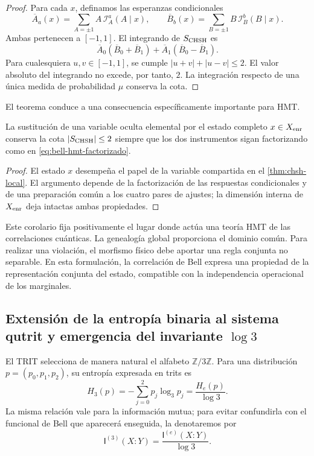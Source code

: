 \begin{proof}
Para cada \(x\), definamos las esperanzas condicionales
\[
 \overline A_a(x)=\sum_{A=\pm1}A\,\mathcal I_A^a(A\mid x),
 \qquad
 \overline B_b(x)=\sum_{B=\pm1}B\,\mathcal I_B^b(B\mid x).
\]
Ambas pertenecen a \([-1,1]\). El integrando de
\(S_{\rm CHSH}\) es
\[
 \overline A_0(\overline B_0+\overline B_1)
 +\overline A_1(\overline B_0-\overline B_1).
\]
Para cualesquiera \(u,v\in[-1,1]\), se cumple
\(\lvert u+v\rvert+\lvert u-v\rvert\leq2\). El valor absoluto del
integrando no excede, por tanto, \(2\). La integración respecto de una única
medida de probabilidad \(\mu\) conserva la cota.
\end{proof}

El teorema conduce a una consecuencia específicamente importante para HMT.

\begin{corollary}
\label{cor:no-go-bell-memoria}
La sustitución de una variable oculta elemental por el estado completo
\(x\in X_{\rm enr}\) conserva la cota
\(\lvert S_{\rm CHSH}\rvert\leq2\) siempre que los dos instrumentos sigan
factorizando como en \eqref{eq:bell-hmt-factorizado}.
\end{corollary}

\begin{proof}
El estado \(x\) desempeña el papel de la variable compartida en el
\cref{thm:chsh-local}. El argumento depende de la factorización de las respuestas
condicionales y de una preparación común a los cuatro pares de ajustes; la dimensión
interna de \(X_{\rm enr}\) deja intactas ambas propiedades.
\end{proof}

Este corolario fija positivamente el lugar donde actúa una teoría HMT de las
correlaciones cuánticas. La genealogía global proporciona el dominio común. Para
realizar una violación, el morfismo físico debe aportar una regla conjunta no
separable. En esta formulación, la correlación de Bell expresa una propiedad de la
representación conjunta del estado, compatible con la independencia operacional de
los marginales.

\subsection{Extensión de la entropía binaria al sistema qutrit y emergencia del invariante \(\log 3\)}

El TRIT selecciona de manera natural el alfabeto
\(\mathbb Z/3\mathbb Z\). Para una distribución
\(p=(p_0,p_1,p_2)\), su entropía expresada en trits es
\begin{equation}
 H_3(p)=-\sum_{j=0}^{2}p_j\log_3p_j
       =\frac{H_e(p)}{\log 3}.
 \label{eq:entropia-base-tres}
\end{equation}
La misma relación vale para la información mutua; para evitar confundirla con el
funcional de Bell que aparecerá enseguida, la denotaremos por
\[
 \mathsf I^{(3)}(X:Y)
 =\frac{\mathsf I^{(e)}(X:Y)}{\log 3}.
\]

